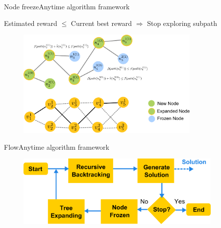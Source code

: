 \begin{frame}{Node freeze}{Anytime algorithm framework}


Estimated reward $ \leq $ Current best reward 
$ \Longrightarrow $ Stop exploring subpath

\begin{figure}
\centering
\includegraphics[width =  0.8\textwidth]{./figure/freeze_process}
\end{figure}

\end{frame}

\begin{frame}{Flow}{Anytime algorithm framework}

\begin{figure}
\centering
\includegraphics[width = 0.9\textwidth]{./figure/alg_flow}
\end{figure}

\end{frame}

